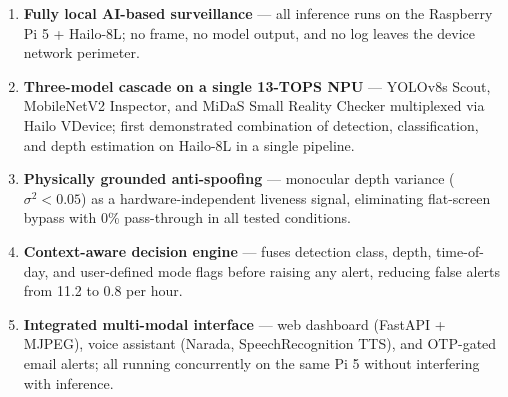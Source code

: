 \documentclass[12pt,a4paper]{article}
\begin{document}
\begin{enumerate}[noitemsep]
  \item \textbf{Fully local AI-based surveillance} — all inference runs on the
        Raspberry Pi 5 + Hailo-8L; no frame, no model output, and no log leaves the
        device network perimeter.
  \item \textbf{Three-model cascade on a single 13-TOPS NPU} — YOLOv8s Scout,
        MobileNetV2 Inspector, and MiDaS Small Reality Checker multiplexed via Hailo
        VDevice; first demonstrated combination of detection, classification, and
        depth estimation on Hailo-8L in a single pipeline.
  \item \textbf{Physically grounded anti-spoofing} — monocular depth variance
        ($\sigma^2 < 0.05$) as a hardware-independent liveness signal, eliminating
        flat-screen bypass with 0\% pass-through in all tested conditions.
  \item \textbf{Context-aware decision engine} — fuses detection class, depth,
        time-of-day, and user-defined mode flags before raising any alert, reducing
        false alerts from 11.2 to 0.8 per hour.
  \item \textbf{Integrated multi-modal interface} — web dashboard (FastAPI + MJPEG),
        voice assistant (Narada, SpeechRecognition TTS), and OTP-gated email alerts;
        all running concurrently on the same Pi 5 without interfering with inference.
\end{enumerate}
\end{document}
